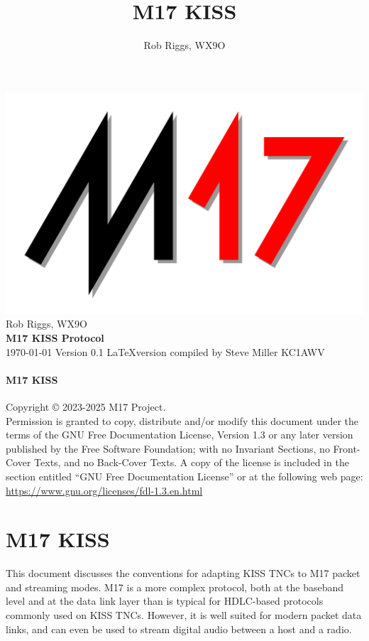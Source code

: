 \documentclass[a4paper,11pt,oneside]{article}
\title{M17 KISS}
\author{Rob Riggs, WX9O}
\begin{document}
\begin{titlepage}
	\raggedleft
	\includegraphics[width=0.7\linewidth,right]{img/m17_logo_shadow}
	\vspace*{\baselineskip}
	{\Large Rob Riggs, WX9O} \\
	\vspace*{0.167\textheight}
	\textbf{\LARGE M17 KISS Protocol} \\
	\today
	\vfill
	{\large Version 0.1}
	\vfill
	\LaTeX version compiled by Steve Miller KC1AWV
\end{titlepage}

\tableofcontents

\pagebreak

\paragraph{M17 KISS}

Copyright \copyright{}  2023-2025  M17 Project. \\

Permission is granted to copy, distribute and/or modify this document under the terms of the GNU Free Documentation License, Version 1.3 or any later version published by the Free Software Foundation; with no Invariant Sections, no Front-Cover Texts, and no Back-Cover Texts. A copy of the license is included in the section entitled ``GNU Free Documentation License'' or at the following web page: \href{https://www.gnu.org/licenses/fdl-1.3.en.html}{https://www.gnu.org/licenses/fdl-1.3.en.html}

\pagebreak

\section{M17 KISS}

This document discusses the conventions for adapting KISS TNCs to M17 packet and streaming modes. M17 is a more complex protocol, both at the baseband level and at the data link layer than is typical for HDLC-based protocols commonly used on KISS TNCs. However, it is well suited for modern packet data links, and can even be used to stream digital audio between a host and a radio.
\end{document}
